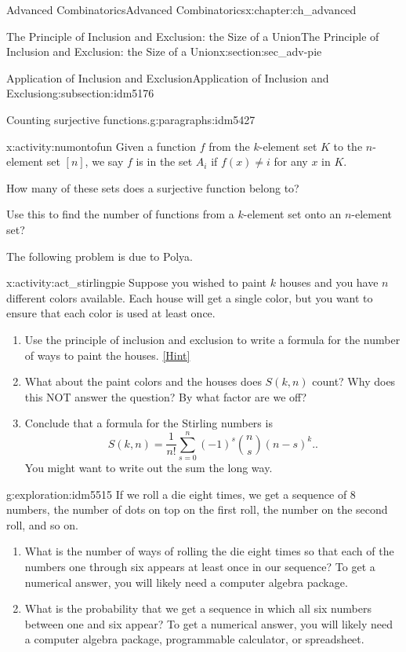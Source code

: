 \documentclass[oneside,10pt,]{book}
\numberwithin{equation}{chapter}
\begin{document}
\begin{chapterptx}{Advanced Combinatorics}{}{Advanced Combinatorics}{}{}{x:chapter:ch_advanced}
\begin{sectionptx}{The Principle of Inclusion and Exclusion: the Size of a Union}{}{The Principle of Inclusion and Exclusion: the Size of a Union}{}{}{x:section:sec_adv-pie}
\begin{subsectionptx}{Application of Inclusion and Exclusion}{}{Application of Inclusion and Exclusion}{}{}{g:subsection:idm5176}
\begin{paragraphs}{Counting surjective functions.}{g:paragraphs:idm5427}
\begin{activity}{}{x:activity:numontofun}
Given a function \(f\) from the \(k\)-element set \(K\) to the \(n\)-element set \([n]\), we say \(f\) is in the set \(A_i\) if \(f(x)\not= i\) for any \(x\) in \(K\).%
\par
How many of these sets does a surjective function belong to?%
\par
Use this to find the number of functions from a \(k\)-element set onto an \(n\)-element set?%
\end{activity}
The following problem is due to Polya.%
\begin{activity}{}{x:activity:act_stirlingpie}%
Suppose you wished to paint \(k\) houses and you have \(n\) different colors available.  Each house will get a single color, but you want to ensure that each color is used at least once.%
\begin{enumerate}[font=\bfseries,label=(\alph*),ref=\alph*]
\item{}Use the principle of inclusion and exclusion to write a formula for the number of ways to paint the houses.%
\space\hspace*{0pt}\hfill{\tiny\hyperlink{g:hint:idm5505-back}{[Hint]}}\item{}What about the paint colors and the houses does \(S(k,n)\) count?  Why does this NOT answer the question?  By what factor are we off?%
\item{}Conclude that a formula for the Stirling numbers is%
\begin{equation*}
S(k,n) = \frac{1}{n!}\sum_{s=0}^n (-1)^s\binom{n}{s}(n-s)^k.\text{.}
\end{equation*}
You might want to write out the sum the long way.%
\end{enumerate}
\end{activity}
\begin{exploration}{}{g:exploration:idm5515}%
If we roll a die eight times, we get a sequence of 8 numbers, the number of dots on top on the first roll, the number on the second roll, and so on.%
\begin{enumerate}[font=\bfseries,label=(\alph*),ref=\alph*]
\item{}What is the number of ways of rolling the die eight times so that each of the numbers one through six appears at least once in our sequence? To get a numerical answer, you will likely need a computer algebra package.%
\item{}What is the probability that we get a sequence in which all six numbers between one and six appear? To get a numerical answer, you will likely need a computer algebra package, programmable calculator, or spreadsheet.%

\end{enumerate}
\end{exploration}
\end{paragraphs}
\end{subsectionptx}
\end{sectionptx}
\end{chapterptx}
\end{document}
